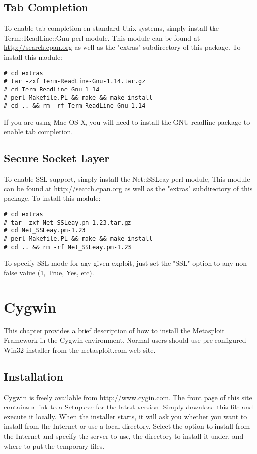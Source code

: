 \documentclass{report}
\begin{document}
	\section{Tab Completion}
	\label{REF-TAB}
\par
To enable tab-completion on standard Unix systems, simply install the
Term::ReadLine::Gnu perl module. This module can be found at
\url{http://search.cpan.org} as well as the "extras" subdirectory of this
package. To install this module:

\begin{verbatim}
# cd extras
# tar -zxf Term-ReadLine-Gnu-1.14.tar.gz
# cd Term-ReadLine-Gnu-1.14
# perl Makefile.PL && make && make install
# cd .. && rm -rf Term-ReadLine-Gnu-1.14
\end{verbatim}

\par
If you are using Mac OS X, you will need to install the GNU readline package to
enable tab completion. 


	\section{Secure Socket Layer}
	\label{REF-SSL}
\par
To enable SSL support, simply install the Net::SSLeay perl module,
This module can be found at \url{http://search.cpan.org} as well as the
"extras" subdirectory of this package. To install this module:

\begin{verbatim}
# cd extras
# tar -zxf Net_SSLeay.pm-1.23.tar.gz
# cd Net_SSLeay.pm-1.23
# perl Makefile.PL && make && make install
# cd .. && rm -rf Net_SSLeay.pm-1.23
\end{verbatim}

\par
To specify SSL mode for any given exploit, just set the "SSL" option
to any non-false value (1, True, Yes, etc).


\pagebreak
\chapter{Cygwin}

\par
This chapter provides a brief description of how to install the Metasploit
Framework in the Cygwin environment. Normal users should use pre-configured
Win32 installer from the metasploit.com web site. 

	\section{Installation}
\par
Cygwin is freely available from \url{http://www.cygin.com}. The front page of
this site contains a link to a Setup.exe for the latest version. Simply
download this file and execute it locally. When the installer starts, it
will ask you whether you want to install from the Internet or use a local
directory. Select the option to install from the Internet and specify the
server to use, the directory to install it under, and where to put the
temporary files.
\end{document}
